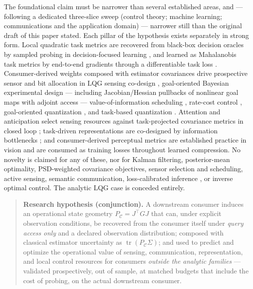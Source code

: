 \documentclass{article}
\theoremstyle{definition}
\theoremstyle{remark}
\newcommand{\PC}{P_{\mathcal{C}}}
\newcommand{\tr}{\operatorname{tr}}
\newcommand{\Sig}{\Sigma}
\begin{document}
The foundational claim must be narrower than several established areas, and
--- following a dedicated three-slice sweep (control theory; machine
learning; communications and the application domain) --- narrower still than
the original draft of this paper stated. Each pillar of the hypothesis exists
separately in strong form. Local quadratic task metrics are recovered from
black-box decision oracles by sampled probing in decision-focused learning
\citep{shah2022,shah2024}, and learned as Mahalanobis task metrics by
end-to-end gradients through a differentiable task loss \citep{bansal2023}.
Consumer-derived weights composed with
estimator covariances drive prospective sensor and bit allocation in LQG
sensing co-design \citep{tzoumas2021}, goal-oriented Bayesian experimental
design \citep{attia2018,wu2023,quadgoed2025} --- including Jacobian/Hessian
pullbacks of nonlinear goal maps with adjoint access --- value-of-information
scheduling \citep{soleymani2022,soleymani2023,soleymani2024}, rate-cost
control \citep{kostina2019,tanaka2015}, goal-oriented quantization
\citep{zou2022}, and task-based quantization \citep{shlezinger2019}. Attention
and anticipation select sensing resources against task-projected covariance
metrics in closed loop \citep{carlone2018}; task-driven representations are
co-designed by information bottlenecks \citep{pacelli2019}; and
consumer-derived perceptual metrics are established practice in vision
\citep{zhang2018} and are consumed as training losses throughout learned
compression. No novelty is claimed for any of these, nor for Kalman
filtering, posterior-mean optimality, PSD-weighted covariance objectives,
sensor selection and scheduling, active sensing, semantic communication,
loss-calibrated inference \citep{lacostejulien2011}, or inverse optimal
control. The analytic LQG case is conceded entirely.

\begin{quote}
\textbf{Research hypothesis (conjunction).} A downstream consumer induces an
operational state geometry $\PC=J^{\top}GJ$ that can, under explicit
observation conditions, be recovered from the consumer itself under
\emph{query access only} and a declared observation distribution; composed
with classical estimator uncertainty as $\tr(\PC\Sig)$; and used to predict
and optimize the operational value of sensing, communication,
representation, and local control resources for consumers \emph{outside the
analytic families} --- validated prospectively, out of sample, at matched
budgets that include the cost of probing, on the actual downstream consumer.
\end{quote}
\end{document}

